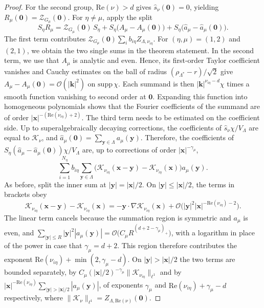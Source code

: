\documentclass[]{amsart}
\numberwithin{mythm}{section}
\begin{document}
\begin{proof}
For the second group, $\mathrm{Re}(\nu)>d$ gives $\hat s_\nu(\bm 0)=0$, yielding
$R_\mu(\bm 0)=\mathcal Z_{G_\mu}(\bm 0)$. For $\eta\neq\mu$, apply the split
\[
S_\eta R_\mu=\mathcal Z_{G_\mu}(\bm 0)\,S_\eta
+S_\eta\big(A_\mu-A_\mu(\bm 0)\big)
+S_\eta\big(\hat a_\mu-\hat a_\mu(\bm 0)\big).
\]
The first term contributes
$\mathcal Z_{G_\mu}(\bm 0)\sum_i b_{i\eta}Z_{\Lambda,\nu_{i\eta}}$. For $(\eta,\mu)=(1,2)$ and $(2,1)$, we obtain the two single sums in the theorem statement. In the second term, we use that $A_\mu$ is analytic and even. Hence, its
first-order Taylor coefficient vanishes and Cauchy estimates on the ball of radius
$(\rho_{\Lambda^\ast}-r)/\sqrt2$ give $A_\mu-A_\mu(\bm 0)=\mathcal O(|\bm k|^{2})$ on $\mathrm{supp}\,\chi$. Each summand is then $|\bm k|^{\nu_{i\eta}-d}\chi$ times a smooth function vanishing to second order at $\bm 0$. Expanding this function into homogeneous polynomials shows that the Fourier coefficients of the summand are of order $|\bm x|^{-(\mathrm{Re}(\nu_{i\eta})+2)}$.  The third term needs to be estimated on the coefficient side. Up to superalgebraically decaying corrections, the coefficients of $\hat s_\nu\chi/V_\Lambda$ are equal to $\mathcal K_\nu$, and $\hat a_\mu(\bm 0)=\sum_{\bm y\in \Lambda}a_\mu(\bm y)$. Therefore, the coefficients of $S_\eta(\hat a_\mu-\hat a_\mu(\bm 0))\chi/V_\Lambda$ are, up to corrections of order $|\bm x|^{-\gamma_\mu}$,
\[
\sum_{i=1}^{N_\eta} b_{i\eta}\sum_{\bm y\in\Lambda}
\Big(\mathcal K_{\nu_{i\eta}}(\bm x-\bm y)-\mathcal K_{\nu_{i\eta}}(\bm x)\Big)
a_\mu(\bm y).
\]
As before, split the inner sum at $|\bm y|=|\bm x|/2$. On $|\bm y|\le|\bm x|/2$, the terms in brackets obey
\[\mathcal K_{\nu_{i\eta}}(\bm x-\bm y)-\mathcal K_{\nu_{i\eta}}(\bm x)=-\bm y\cdot\nabla\mathcal K_{\nu_{i\eta}}(\bm x)
+\mathcal O\big(|\bm y|^{2}|\bm x|^{-\mathrm{Re}(\nu_{i\eta})-2}\big).\] The linear term cancels because the summation region is symmetric and $a_\mu$ is even, and $\sum_{|\bm y|\le R}|\bm y|^{2}|a_\mu(\bm y)| =\mathcal O\big(C_\mu R^{(d+2-\gamma_\mu)_+}\big)$, with a logarithm in place of the power in case that $\gamma_\mu=d+2$. 
This region therefore contributes the exponent $\mathrm{Re}(\nu_{i\eta})+\min(2,\gamma_\mu-d)$. On $|\bm y|>|\bm x|/2$ the two terms are bounded separately, by $C_\mu(|\bm x|/2)^{-\gamma_\mu}\|\mathcal K_{\nu_{i\eta}}\|_{\ell^1}$ and by $|\bm x|^{-\mathrm{Re}(\nu_{i\eta})}\sum_{|\bm y|>|\bm x|/2}|a_\mu(\bm y)|$, of exponents $\gamma_\mu$ and $\mathrm{Re}(\nu_{i\eta})+\gamma_\mu-d$ respectively, where $\|\mathcal K_\nu\|_{\ell^1}=Z_{\Lambda,\mathrm{Re}(\nu)}(\bm 0)$.


\end{proof}
\end{document}
